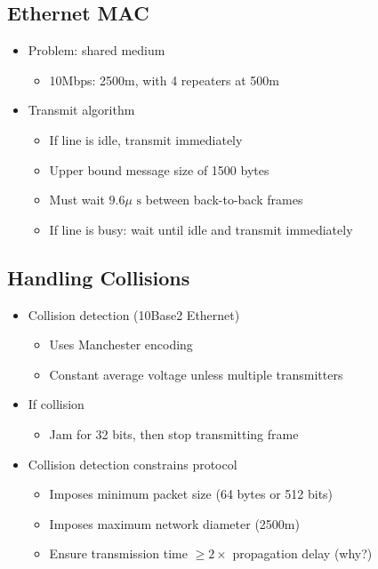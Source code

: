 \subsection{Ethernet MAC}
\begin{itemize}
    \item Problem: shared medium
          \begin{itemize}
              \item 10Mbps: 2500m, with 4 repeaters at 500m
          \end{itemize}
    \item Transmit algorithm
          \begin{itemize}
              \item If line is idle, transmit immediately
              \item Upper bound message size of 1500 bytes
              \item Must wait $9.6\mu\text{ s}$ between back-to-back frames
              \item If line is busy: wait until idle and transmit immediately
          \end{itemize}
\end{itemize}

\subsection{Handling Collisions}
\begin{itemize}
    \item Collision detection (10Base2 Ethernet)
          \begin{itemize}
              \item Uses Manchester encoding
              \item Constant average voltage unless multiple transmitters
          \end{itemize}
    \item If collision
          \begin{itemize}
              \item Jam for 32 bits, then stop transmitting frame
          \end{itemize}
    \item Collision detection constrains protocol
          \begin{itemize}
              \item Imposes minimum packet size (64 bytes or 512 bits)
              \item Imposes maximum network diameter (2500m)
              \item Ensure transmission time $\geq 2\times$ propagation delay (why?)
          \end{itemize}
\end{itemize}

